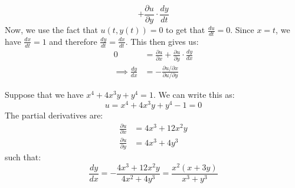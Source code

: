 \begin{itemize}
\begin{equation}
        + \frac{\partial u}{\partial y}\cdot \frac{dy}{dt}
    \end{equation}
    Now, we use the fact that $u(t,y(t))=0$ to get that $\frac{du}{dt}=0$. Since $x=t$, we have $\frac{dx}{dt}=1$ and therefore $\frac{dy}{dt} = \frac{dx}{dt}$. This then gives us:
    \begin{align}
        0 &= \frac{\partial u}{\partial x} + \frac{\partial u}{\partial y} \cdot \frac{dy}{dx} \\ 
        \implies \frac{dy}{dx} &= - \frac{\partial u/\partial x}{\partial u/\partial y}
    \end{align}
    \begin{example}
        Suppose that we have $x^4+4x^3y+y^4=1$. We can write this as:
        \begin{equation}
            u=x^4+4x^3y+y^4-1 = 0
        \end{equation}
        The partial derivatives are:
        \begin{align}
            \frac{\partial u}{\partial x} &= 4x^3+12x^2y \\
            \frac{\partial u}{\partial y} &= 4x^3 + 4y^3 
        \end{align}
        such that:
        \begin{equation}
            \frac{dy}{dx} = - \frac{4x^3+12x^2y}{4x^2+4y^3} = \frac{x^2(x+3y)}{x^3+y^3}
        \end{equation}
    \end{example}
\end{itemize}